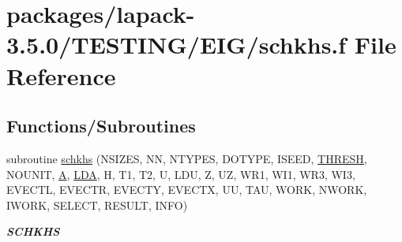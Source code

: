 \hypertarget{schkhs_8f}{}\section{packages/lapack-\/3.5.0/\+T\+E\+S\+T\+I\+N\+G/\+E\+I\+G/schkhs.f File Reference}
\label{schkhs_8f}
\subsection*{Functions/\+Subroutines}
\begin{DoxyCompactItemize}
\item 
subroutine \hyperlink{group__single__eig_gad6528d7acb91f950d1fae5bf68961251}{schkhs} (N\+S\+I\+Z\+E\+S, N\+N, N\+T\+Y\+P\+E\+S, D\+O\+T\+Y\+P\+E, I\+S\+E\+E\+D, \hyperlink{zlaqgs_8c_a0656018abfc9fa2821827415f5d5ea57}{T\+H\+R\+E\+S\+H}, N\+O\+U\+N\+I\+T, \hyperlink{classA}{A}, \hyperlink{example__user_8c_ae946da542ce0db94dced19b2ecefd1aa}{L\+D\+A}, H, T1, T2, U, L\+D\+U, Z, U\+Z, W\+R1, W\+I1, W\+R3, W\+I3, E\+V\+E\+C\+T\+L, E\+V\+E\+C\+T\+R, E\+V\+E\+C\+T\+Y, E\+V\+E\+C\+T\+X, U\+U, T\+A\+U, W\+O\+R\+K, N\+W\+O\+R\+K, I\+W\+O\+R\+K, S\+E\+L\+E\+C\+T, R\+E\+S\+U\+L\+T, I\+N\+F\+O)
\begin{DoxyCompactList}\small\item\em {\bfseries S\+C\+H\+K\+H\+S} \end{DoxyCompactList}\end{DoxyCompactItemize}
